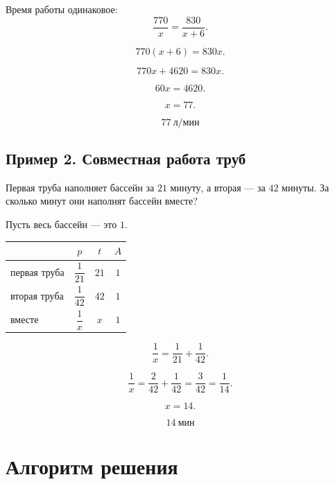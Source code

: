 \documentclass[a4paper,12pt]{article}
\newcommand{\minut}{\text{мин}}
\newcommand{\lpm}{\text{л/мин}}
\begin{document}
Время работы одинаковое:
\[
\frac{770}{x}=\frac{830}{x+6}.
\]

\[
770(x+6)=830x.
\]

\[
770x+4620=830x.
\]

\[
60x=4620.
\]

\[
x=77.
\]

\[
\boxed{77\ \lpm}
\]

\subsection{Пример 2. Совместная работа труб}

Первая труба наполняет бассейн за $21$ минуту, а вторая --- за $42$ минуты. За сколько минут они наполнят бассейн вместе?

Пусть весь бассейн --- это $1$.

\begin{center}
\renewcommand{\arraystretch}{1.35}
\begin{tabularx}{0.82\linewidth}{X c c c}
\toprule
 & $p$ & $t$ & $A$ \\
\midrule
первая труба & $\dfrac{1}{21}$ & $21$ & $1$ \\
вторая труба & $\dfrac{1}{42}$ & $42$ & $1$ \\
вместе & $\dfrac{1}{x}$ & $x$ & $1$ \\
\bottomrule
\end{tabularx}
\end{center}

\[
\frac{1}{x}=\frac{1}{21}+\frac{1}{42}.
\]

\[
\frac{1}{x}=\frac{2}{42}+\frac{1}{42}=\frac{3}{42}=\frac{1}{14}.
\]

\[
x=14.
\]

\[
\boxed{14\ \minut}
\]

\section{Алгоритм решения}
\end{document}
